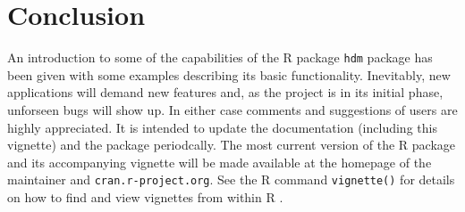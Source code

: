 \documentclass{amsart}
\newcommand{\R}{{\normalfont\textsf{R }}{}}
\begin{document}
\section{Conclusion}

An introduction to some of the capabilities of the \R package \texttt{hdm}
package has been given with some examples describing its basic functionality. Inevitably, new applications will
demand new features and, as the project is in its initial phase, unforseen bugs will show up. In either case comments and suggestions of users are highly appreciated. It is intended to update the documentation (including this vignette) and the package periodcally. The most current version of the \R package and its accompanying vignette will be made available at the homepage of the maintainer and \texttt{cran.r-project.org}. See the \R command \texttt{vignette()} for details on how to find
and view vignettes from within \R.



\footnotesize
%

\end{document}
